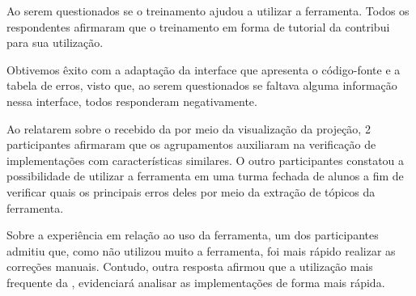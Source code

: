 		Ao serem questionados se o treinamento ajudou a utilizar a ferramenta.
		Todos os respondentes afirmaram que o treinamento em forma de tutorial da
		 contribui para sua utilização.
		
		Obtivemos êxito com a adaptação da interface que apresenta o código-fonte e a
		tabela de erros, visto que, ao serem questionados se faltava
		alguma informação nessa interface, todos responderam negativamente.
		
		Ao relatarem sobre o  recebido da 
		por meio da visualização da projeção, 2 participantes afirmaram que
		os agrupamentos auxiliaram na verificação de implementações com características
		similares. O outro participantes constatou a possibilidade de utilizar a
		ferramenta em uma turma fechada de alunos a fim de verificar quais os principais
		erros deles por meio da extração de tópicos da ferramenta.
		
		Sobre a experiência em relação ao uso da ferramenta, um dos participantes
		admitiu que, como não utilizou muito a ferramenta, foi mais rápido realizar
		as correções manuais. Contudo, outra resposta afirmou que a utilização mais
		frequente da , evidenciará analisar as implementações
		de forma mais rápida.
		
